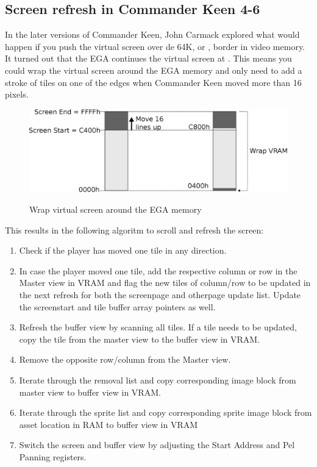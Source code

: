 \documentclass[book.tex]{subfiles}
\begin{document}
\subsection{Screen refresh in Commander Keen 4-6}
In the later versions of Commander Keen, John Carmack explored what would happen if you push the virtual screen over de 64K, or , border in video memory. It turned out that the EGA continues the virtual screen at . This means you could wrap the virtual screen around  the EGA memory and only need to add a stroke of tiles on one of the edges when Commander Keen moved more than 16 pixels.
\\
\begin{figure}[H]
  \centering
  \includegraphics[width=\textwidth]{imgs/drawings/ega_wrapping.eps}
  \label{fig:ega_wrapping}
  \caption{Wrap virtual screen around the EGA memory}
\end{figure}

This results in the following algoritm to scroll and refresh the screen:
\begin{enumerate}
\item Check if the player has moved one tile in any direction.
\item In case the player moved one tile, add the respective column or row in the Master view in VRAM and flag the new tiles of column/row to be updated in the next refresh for both the screenpage and otherpage update list. Update the screenstart and tile buffer array pointers as well.
\item Refresh the buffer view by scanning all tiles. If a tile needs to be updated, copy the tile from the master view to the buffer view in VRAM.
\item Remove the opposite row/column from the Master view.
\item Iterate through the removal list and copy corresponding image block from master view to buffer view in VRAM. 
\item Iterate through the sprite list and copy corresponding sprite image block from asset location in RAM to buffer view in VRAM
\item Switch the screen and buffer view by adjusting the Start Address and Pel Panning registers.
\end{enumerate}
\end{document}
